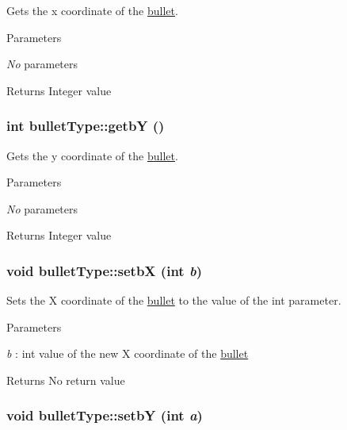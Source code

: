 Gets the x coordinate of the \hyperlink{classbullet}{bullet}. 
\begin{DoxyParams}{Parameters}
\item[{\em No}]parameters \end{DoxyParams}
\begin{DoxyReturn}{Returns}
Integer value 
\end{DoxyReturn}
\hypertarget{classbulletType_a6787ea4992f2fead3ee07e9216b06d4e}{
\subsubsection[{getbY}]{\setlength{\rightskip}{0pt plus 5cm}int bulletType::getbY ()}}
\label{classbulletType_a6787ea4992f2fead3ee07e9216b06d4e}


Gets the y coordinate of the \hyperlink{classbullet}{bullet}. 
\begin{DoxyParams}{Parameters}
\item[{\em No}]parameters \end{DoxyParams}
\begin{DoxyReturn}{Returns}
Integer value 
\end{DoxyReturn}
\hypertarget{classbulletType_af69e22a00c81d5610cfb121dabf25b2b}{
\subsubsection[{setbX}]{\setlength{\rightskip}{0pt plus 5cm}void bulletType::setbX (int {\em b})}}
\label{classbulletType_af69e22a00c81d5610cfb121dabf25b2b}


Sets the X coordinate of the \hyperlink{classbullet}{bullet} to the value of the int parameter. 
\begin{DoxyParams}{Parameters}
\item[{\em b}]: int value of the new X coordinate of the \hyperlink{classbullet}{bullet} \end{DoxyParams}
\begin{DoxyReturn}{Returns}
No return value 
\end{DoxyReturn}
\hypertarget{classbulletType_a623f1eeb1381c512708efccafbb3c192}{
\subsubsection[{setbY}]{\setlength{\rightskip}{0pt plus 5cm}void bulletType::setbY (int {\em a})}}
\label{classbulletType_a623f1eeb1381c512708efccafbb3c192}


